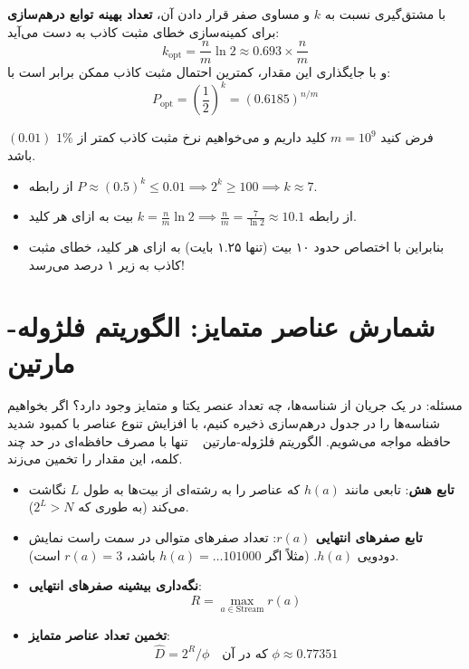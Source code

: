 با مشتق‌گیری نسبت به $k$ و مساوی صفر قرار دادن آن، \textbf{تعداد بهینه توابع درهم‌سازی} برای کمینه‌سازی خطای مثبت کاذب به دست می‌آید:
\begin{equation}
k_{\text{opt}} = \frac{n}{m} \ln 2 \approx 0.693 \times \frac{n}{m}
\end{equation}
و با جایگذاری این مقدار، کمترین احتمال مثبت کاذب ممکن برابر است با:
\begin{equation}
P_{\text{opt}} = \left( \frac{1}{2} \right)^k = (0.6185)^{n/m}
\end{equation}

\begin{example}
فرض کنید $m = 10^9$ کلید داریم و می‌خواهیم نرخ مثبت کاذب کمتر از $1\%$ $(0.01)$ باشد.
\begin{itemize}
    \item از رابطه $P \approx (0.5)^k \le 0.01 \implies 2^k \ge 100 \implies k \approx 7$.
    \item از رابطه $k = \frac{n}{m} \ln 2 \implies \frac{n}{m} = \frac{7}{\ln 2} \approx 10.1$ بیت به ازای هر کلید.
    \item بنابراین با اختصاص حدود ۱۰ بیت (تنها ۱.۲۵ بایت) به ازای هر کلید، خطای مثبت کاذب به زیر ۱ درصد می‌رسد!
\end{itemize}
\end{example}

\section{شمارش عناصر متمایز: الگوریتم فلژوله-مارتین \texorpdfstring{}{(Flajolet-Martin)}}
مسئله: در یک جریان از شناسه‌ها، چه تعداد عنصر یکتا و متمایز وجود دارد؟
اگر بخواهیم شناسه‌ها را در جدول درهم‌سازی ذخیره کنیم، با افزایش تنوع عناصر با کمبود شدید حافظه مواجه می‌شویم. الگوریتم فلژوله-مارتین ~\cite{flajolet1985probabilistic} تنها با مصرف حافظه‌ای در حد چند کلمه، این مقدار را تخمین می‌زند.

\begin{algorithmbox}
\begin{itemize}
    \item \textbf{تابع هش}: تابعی مانند $h(a)$ که عناصر را به رشته‌ای از بیت‌ها به طول $L$ نگاشت می‌کند (به طوری که $2^L > N$).
    \item \textbf{تابع صفرهای انتهایی $r(a)$}: تعداد صفرهای متوالی در سمت راست نمایش دودویی $h(a)$.
    (مثلاً اگر $h(a) = \dots 101000$ باشد، $r(a) = 3$ است).
    \item \textbf{نگه‌داری بیشینه صفرهای انتهایی}:
    \begin{equation}
    R = \max_{a \in \text{Stream}} r(a)
    \end{equation}
    \item \textbf{تخمین تعداد عناصر متمایز}:
    \begin{equation}
    \hat{D} = 2^R / \phi \quad \text{که در آن } \phi \approx 0.77351
    \end{equation}
\end{itemize}
\end{algorithmbox}

